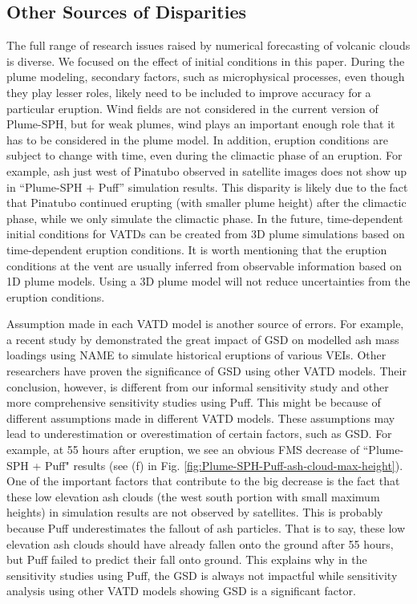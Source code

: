 \documentclass[utf8]{frontiersSCNS} %
\begin{document}
\subsection{Other Sources of Disparities}
The full range of research issues raised by numerical forecasting of volcanic clouds is diverse. We focused on the effect of initial conditions in this paper. During the plume modeling, secondary factors, such as microphysical processes, even though they play lesser roles, likely need to be included to improve accuracy for a particular eruption. Wind fields are not considered in the current version of Plume-SPH, but for weak plumes, wind plays an important enough role that it has to be considered in the plume model. In addition, eruption conditions are subject to change with time, even during the climactic phase of an eruption. For example, ash just west of Pinatubo observed in satellite images does not show up in ``Plume-SPH + Puff'' simulation results. This disparity is likely due to the fact that Pinatubo continued erupting (with smaller plume height) after the climactic phase, while we only simulate the climactic phase. In the future, time-dependent initial conditions for VATDs can be created from 3D plume simulations based on time-dependent eruption conditions. It is worth mentioning that the eruption conditions at the vent are usually inferred from observable information based on 1D plume models. Using a 3D plume model will not reduce uncertainties from the eruption conditions.

Assumption made in each VATD model is another source of errors. For example, a recent study by \citet{osman2020sensitivity} demonstrated the great impact of GSD on modelled ash mass loadings using NAME\citep{jones2007uk} to simulate historical eruptions of various VEIs. Other researchers \citep{beckett2015sensitivity,scollo2008parametric} have proven the significance of GSD using other VATD models. Their conclusion, however, is different from our informal sensitivity study and other more comprehensive sensitivity studies using Puff. This might be because of different assumptions made in different VATD models. These assumptions may lead to underestimation or overestimation of certain factors, such as GSD. For example, at 55 hours after eruption, we see an obvious FMS decrease of ``Plume-SPH + Puff"  results (see (f) in Fig. \ref{fig:Plume-SPH-Puff-ash-cloud-max-height}). One of the important factors that contribute to the big decrease is the fact that these low elevation ash clouds (the west south portion with small maximum heights) in simulation results are not observed by satellites. This is probably because Puff underestimates the fallout of ash particles. That is to say, these low elevation ash clouds should have already fallen onto the ground after 55 hours, but Puff failed to predict their fall onto ground. This explains why in the sensitivity studies using Puff, the GSD is always not impactful while sensitivity analysis using other VATD models showing GSD is a significant factor.
\end{document}
